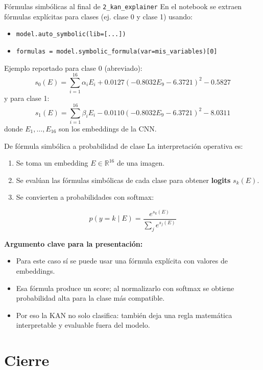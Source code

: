 \documentclass[aspectratio=169,spanish]{beamer}
\begin{document}
\begin{frame}{Fórmulas simbólicas al final de \texttt{2\_kan\_explainer}}
  \small
  En el notebook se extraen fórmulas explícitas para clases (ej. clase 0 y clase 1) usando:
  \begin{itemize}
    \item \texttt{model.auto\_symbolic(lib=[...])}
    \item \texttt{formulas = model.symbolic\_formula(var=mis\_variables)[0]}
  \end{itemize}

  \vspace{0.4em}
  Ejemplo reportado para clase 0 (abreviado):
  \[
  s_0(E)=\sum_{i=1}^{16}\alpha_i E_i + 0.0127(-0.8032E_9-6.3721)^2 - 0.5827
  \]
  y para clase 1:
  \[
  s_1(E)=\sum_{i=1}^{16}\beta_i E_i - 0.0110(-0.8032E_9-6.3721)^2 - 8.0311
  \]
  donde \(E_1,\dots,E_{16}\) son los embeddings de la CNN.
\end{frame}

\begin{frame}{De fórmula simbólica a probabilidad de clase}
  \small
  La interpretación operativa es:
  \begin{enumerate}
    \item Se toma un embedding \(E\in\mathbb{R}^{16}\) de una imagen.
    \item Se evalúan las fórmulas simbólicas de cada clase para obtener \textbf{logits} \(s_k(E)\).
    \item Se convierten a probabilidades con softmax:
  \end{enumerate}
  \[
  p(y=k\mid E)=\frac{e^{s_k(E)}}{\sum_j e^{s_j(E)}}
  \]

  \vspace{0.5em}
  \textbf{Argumento clave para la presentación:}
  \begin{itemize}
    \item Para este caso sí se puede usar una fórmula explícita con valores de embeddings.
    \item Esa fórmula produce un score; al normalizarlo con softmax se obtiene probabilidad alta para la clase más compatible.
    \item Por eso la KAN no solo clasifica: también deja una regla matemática interpretable y evaluable fuera del modelo.
  \end{itemize}
\end{frame}

\section{Cierre}
\end{document}
